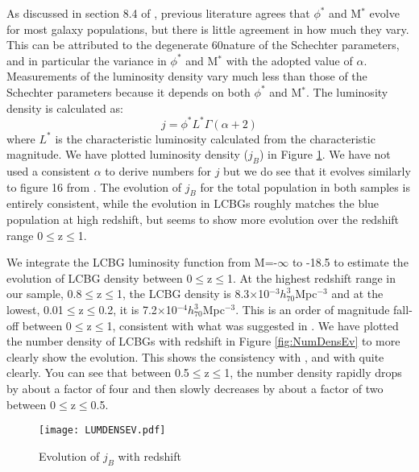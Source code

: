 \documentclass[manuscript]{aastex61}
\begin{document}
As discussed in section 8.4 of \citet{2015ApJ...815...94B}, previous literature agrees that $\phi^{*}$ and M$^{*}$ evolve for most galaxy populations, but there is little agreement in how much they vary. This can be attributed to the degenerate 60nature of the Schechter parameters, and in particular the variance in $\phi^{*}$ and M$^{*}$ with the adopted value of $\alpha$. Measurements of the luminosity density vary much less than those of the Schechter parameters because it depends on both $\phi^{*}$ and M$^{*}$. The luminosity density is calculated as:
\begin{equation}
j=\phi^{*}L^{*}\Gamma(\alpha+2)
\end{equation}
where $L^{*}$ is the characteristic luminosity calculated from the characteristic magnitude. We have plotted luminosity density ($j_{B}$) in Figure \ref{fig:LUMDENSEV}. We have not used a consistent $\alpha$ to derive numbers for $j$ but we do see that it evolves similarly to figure 16 from \citet{2015ApJ...815...94B}. The evolution of $j_{B}$ for the total population in both samples is entirely consistent, while the evolution in LCBGs roughly matches the \citet{2015ApJ...815...94B} blue population at high redshift, but seems to show more evolution over the redshift range 0$\leq$z$\leq$1.

We integrate the LCBG luminosity function from M=-$\infty$ to -18.5 to estimate the evolution of LCBG density between 0$\leq$z$\leq$1. At the highest redshift range in our sample, 0.8$\leq$z$\leq$1, the LCBG density is 8.3$\times$10$^{-3}h_{70}^{3}$Mpc$^{-3}$ and at the lowest, 0.01$\leq$z$\leq$0.2, it is 7.2$\times$10$^{-4}h_{70}^{3}$Mpc$^{-3}$. This is an order of magnitude fall-off between 0$\leq$z$\leq$1, consistent with what was suggested in \citet{2004ApJ...617.1004W}. We have plotted the number density of LCBGs with redshift in Figure \ref{fig:NumDensEv} to more clearly show the evolution. This shows the consistency with \citet{2004ApJ...617.1004W}, and with \citet{1997ApJ...489..543P} quite clearly. You can see that between 0.5$\leq$z$\leq$1, the number density rapidly drops by about a factor of four and then slowly decreases by about a factor of two between 0$\leq$z$\leq$0.5. 

\begin{center}
\begin{figure}
\texttt{[image: LUMDENSEV.pdf]}
\caption{Evolution of $j_{B}$ with redshift}
\label{fig:LUMDENSEV}
\end{figure}
\end{center}
\end{document}
